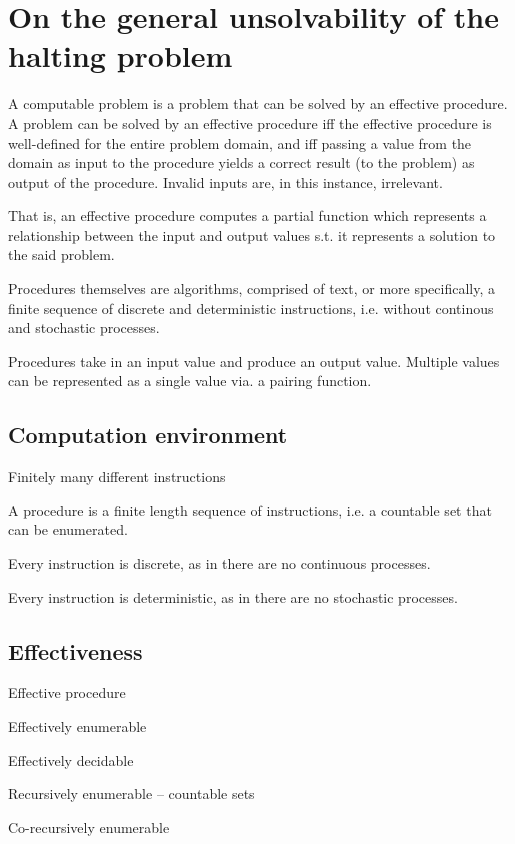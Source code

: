 \chapter{On the general unsolvability of the halting problem}

A computable problem is a problem that can be solved by an effective procedure.
A problem can be solved by an effective procedure iff the effective procedure
is well-defined for the entire problem domain, and iff passing a value from the
domain as input to the procedure yields a correct result (to the problem) as
output of the procedure. Invalid inputs are, in this instance, irrelevant.

That is, an effective procedure computes a partial function which represents a
relationship between the input and output values s.t. it represents a solution
to the said problem.

Procedures themselves are algorithms, comprised of text, or more specifically,
a finite sequence of discrete and deterministic instructions, i.e. without
continous and stochastic processes.


Procedures take in an input value and produce an output value. Multiple values
can be represented as a single value via. a pairing function.

\section{Computation environment}

Finitely many different instructions

A procedure is a finite length sequence of instructions, i.e. a countable set
that can be enumerated.

Every instruction is discrete, as in there are no continuous processes.

Every instruction is deterministic, as in there are no stochastic processes.

\section{Effectiveness}

Effective procedure

Effectively enumerable

Effectively decidable

Recursively enumerable -- countable sets

Co-recursively enumerable



